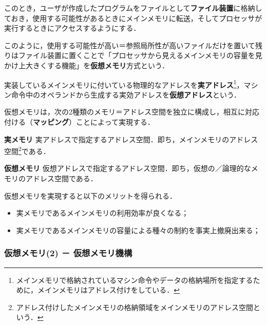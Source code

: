 このとき，ユーザが作成したプログラムをファイルとして\textbf{ファイル装置}に格納しておき，使用する可能性があるときにメインメモリに転送，そしてプロセッサが実行するときにアクセスするようにする．

このように，使用する可能性が高い＝参照局所性が高いファイルだけを置いて残りはファイル装置に置くことで「プロセッサから見えるメインメモリの容量を見かけ上大きくする機能」を\textbf{仮想メモリ}方式という．

実装しているメインメモリに付いている物理的なアドレスを\textbf{実アドレス}\footnote{メインメモリで格納されているマシン命令やデータの格納場所を指定するために，メインメモリはアドレス付けをしている．}，マシン命令中のオペランドから生成する実効アドレスを\textbf{仮想アドレス}という．

仮想メモリは，次の2種類のメモリ＝アドレス空間を独立に構成し，相互に対応付ける（\textbf{マッピング}）ことによって実現する．
\begin{enumerate}[label=\textbf{[\arabic*]}, labelsep=10pt, leftmargin=23pt]
	\item \textbf{実メモリ}\hspace*{3\zw} 実アドレスで指定するアドレス空間．即ち，メインメモリのアドレス空間\footnote{アドレス付けしたメインメモリの格納領域をメインメモリのアドレス空間という．}である．
	\item \textbf{仮想メモリ}\hspace*{2\zw} 仮想アドレスで指定するアドレス空間．即ち，仮想の／論理的なメモリのアドレス空間である．
\end{enumerate}

仮想メモリを実現すると以下のメリットを得られる．
\begin{itemize}
	\item 実メモリであるメインメモリの利用効率が良くなる；
	\item 実メモリであるメインメモリの容量による種々の制約を事実上撤廃出来る；
\end{itemize}



\subsubsection{仮想メモリ(2) － 仮想メモリ機構}\label{sec27-2-D-6}

